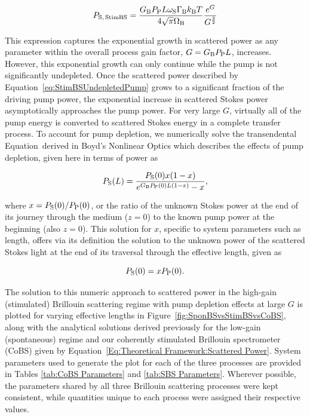 \begin{equation}
  P_{\rm S,\,StimBS} = \frac{G_{\rm B}P_{\rm P}L\omega_{\rm S}\Gamma_{\rm B}k_{\rm B}T}{4\sqrt{\pi}\Omega_{\rm B}}\frac{e^{G}}{G^{\frac{3}{2}}}
  \label{eq:StimBSUndepletedPump}
\end{equation}

This expression captures the exponential growth in scattered power as any parameter within the overall process gain factor, \(G = G_{\rm B}P_{\rm P}L\), increases. However, this exponential growth can only continue while the pump is not significantly undepleted. Once the scattered power described by Equation~\ref{eq:StimBSUndepletedPump} grows to a significant fraction of the driving pump power, the exponential increase in scattered Stokes power asymptotically approaches the pump power. For very large \(G\), virtually all of the pump energy is converted to scattered Stokes energy in a complete transfer process.\cite{boyd2020nonlinear} To account for pump depletion, we numerically solve the transendental Equation~derived in Boyd's Nonlinear Optics which describes the effects of pump depletion, given here in terms of power as

\begin{equation}
  P_{\rm S}(L) = \frac{P_{\rm S}(0)x(1 - x)}{e^{G_{\rm B}P_{\rm P}(0)L(1 - x)} - x},
\end{equation}

where \(x = P_{\rm S}(0)/P_{\rm P}(0)\), or the ratio of the unknown Stokes power at the end of its journey through the medium (\(z=0\)) to the known pump power at the beginning (also \(z=0\)). This solution for \(x\), specific to system parameters such as length, offers via its definition the solution to the unknown power of the scattered Stokes light at the end of its traversal through the effective length, given as

\begin{equation}
  P_{\rm S}(0) = xP_{\rm P}(0).
\end{equation}

The solution to this numeric approach to scattered power in the high-gain (stimulated) Brillouin scattering regime with pump depletion effects at large \(G\) is plotted for varying effective lengths in Figure~\ref{fig:SponBSvsStimBSvsCoBS}, along with the analytical solutions derived previously for the low-gain (spontaneous) regime and our coherently stimulated Brillouin spectrometer (\acs{CoBS}) given by Equation~\ref{Eq:Theoretical Framework:Scattered Power}. System parameters used to generate the plot for each of the three processes are provided in Tables \ref{tab:CoBS Parameters} and \ref{tab:SBS Parameters}. Wherever possible, the parameters shared by all three Brillouin scattering processes were kept consistent, while quantities unique to each process were assigned their respective values.


